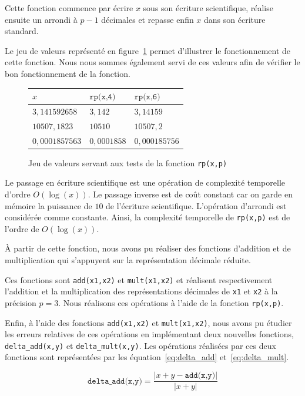\documentclass{article}
\begin{document}
Cette fonction commence par écrire $x$ sous son écriture scientifique, réalise ensuite un arrondi à $p-1$ décimales et repasse enfin $x$ dans son écriture standard.

Le jeu de valeurs représenté en figure~\ref{fig:tests_rp} permet d'illustrer le fonctionnement de cette fonction. Nous nous sommes également servi de ces valeurs afin de vérifier le bon fonctionnement de la fonction.

\begin{figure}[h]
  \centering
  \begin{tabular}{|l|l|l|}
    \hline
    $x$ & $\texttt{rp(x,4)}$ & $\texttt{rp(x,6)}$ \\
    \hline
    $3,141592658$ & $3,142$ & $3,14159$ \\
    \hline
    $10507,1823$ & $10510$ & $10507,2$ \\
    \hline
    $0,0001857563$ & $0,0001858$ & $0,000185756$ \\
    \hline
  \end{tabular}
  \caption{Jeu de valeurs servant aux tests de la fonction \texttt{rp(x,p)}}
  \label{fig:tests_rp}
\end{figure}

Le passage en écriture scientifique est une opération de complexité temporelle d'ordre $O(\log(x))$. Le passage inverse est de coût constant car on garde en mémoire la puissance de $10$ de l'écriture scientifique. L'opération d'arrondi est considérée comme constante. Ainsi, la complexité temporelle de \verb|rp(x,p)| est de l'ordre de $O(\log(x))$.
\vskip 1mm ~
 
À partir de cette fonction, nous avons pu réaliser des fonctions d'addition et de multiplication qui s'appuyent sur la représentation décimale réduite.

Ces fonctions sont \verb|add(x1,x2)| et \verb|mult(x1,x2)| et réalisent respectivement l'addition et la multiplication des représentations décimales de \verb|x1| et \verb|x2| à la précision $p=3$. Nous réalisons ces opérations à l'aide de la fonction \verb|rp(x,p)|.
\vskip 1mm ~

Enfin, à l'aide des fonctions \verb|add(x1,x2)| et \verb|mult(x1,x2)|, nous avons pu étudier les erreurs relatives de ces opérations en implémentant deux nouvelles fonctions, \verb|delta_add(x,y)| et \verb|delta_mult(x,y)|. Les opérations réalisées par ces deux fonctions sont représentées par les équation~\ref{eq:delta_add} et~\ref{eq:delta_mult}.

\begin{equation}
  \texttt{delta\_add(x,y)} = \dfrac{\big\vert x + y - \texttt{add(x,y)} \big\vert}{\big\vert x+y \big\vert}
  \label{eq:delta_add}
\end{equation}
\end{document}
